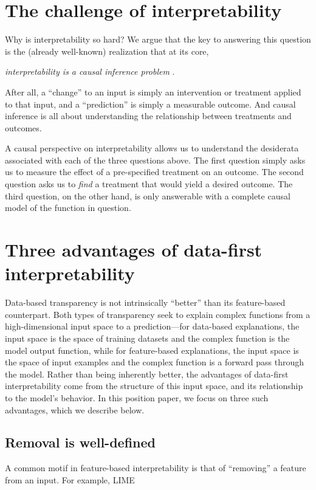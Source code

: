 \documentclass{article}
\begin{document}
\section{The challenge of interpretability}
Why is interpretability so hard? 
We argue that the key to answering this question 
is the (already well-known) realization that at its core,
\begin{center}
{\em interpretability is a causal inference problem} \citep{chungus,fungus,mungus}.
\end{center}
After all, a ``change'' to an input is simply an intervention or treatment 
applied to that input, and a ``prediction'' is simply a measurable outcome. 
And causal inference is all about understanding the relationship between
treatments and outcomes.

A causal perspective on interpretability allows us to understand the 
desiderata associated with each of the three questions above.
The first question simply asks us to measure the effect of a 
pre-specified treatment on an outcome.
The second question asks us to {\em find} a treatment that would yield a 
desired outcome.
The third question, on the other hand, is only answerable with a 
complete causal model of the function in question.



\section{Three advantages of data-first interpretability}
Data-based transparency is not intrinsically ``better'' than its feature-based counterpart. 
Both types of transparency seek to explain complex functions from 
a high-dimensional input space to a prediction---for data-based explanations, 
the input space is the space of training datasets and the complex function is 
the model output function, while for feature-based explanations, the input space 
is the space of input examples and the complex function is a forward pass through 
the model.
Rather than being inherently better, the advantages of data-first interpretability 
come from the structure of this input space, and its relationship to the model's 
behavior. In this position paper, we focus on three such advantages, 
which we describe below.

\subsection{Removal is well-defined}
A common motif in feature-based interpretability is that of ``removing'' a
feature from an input.
For example, LIME \citep{ribeiro2016should}
\end{document}
